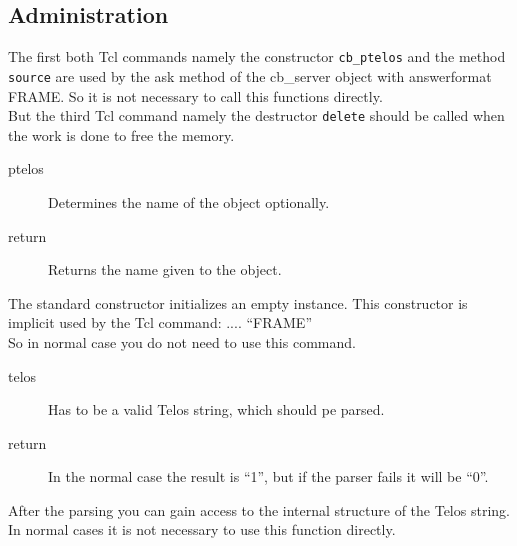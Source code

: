  \subsection{Administration}
	The first both Tcl commands namely the constructor {\tt cb\_ptelos}
	and the method {\tt source} are used by the ask method of the 
	cb\_server object with answerformat FRAME. 
	So it is not necessary to call this functions directly. \\
	But the third Tcl command namely the destructor {\tt delete}
	 should be called when the work is done to free the memory. \\
	\begin{method}{ }
	  \begin{description}
	     \item[ ptelos]
		Determines the name of the object optionally.
	     \item[ return] 
		Returns the name given to the object.
	  \end{description}
	The standard constructor initializes an empty instance. 
	This constructor is implicit used by the Tcl command:
	   .... ``FRAME''\\
	So in normal case you do not need to use this command.
	\end{method}

	\begin{method}{  }
	  \begin{description}
	     \item[ telos]
		Has to be a valid Telos string, 
		which should pe parsed.
	     \item[ return]
		In the normal case the result is ``1'', 
		but if the parser fails it will be ``0''.
	  \end{description}
	After the parsing you can gain access to
	the internal structure of the Telos string.\\
	In normal cases it is not necessary to use this function directly.
	\end{method}

